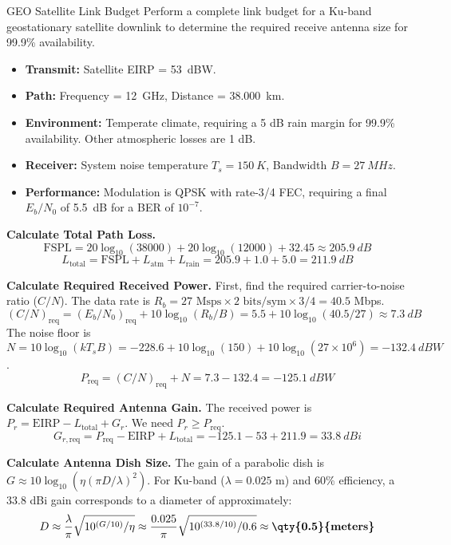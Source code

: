 \begin{workedexample}{GEO Satellite Link Budget}
     Perform a complete link budget for a Ku-band geostationary satellite downlink to determine the required receive antenna size for 99.9\% availability.
    
    \begin{itemize}
        \item \textbf{Transmit:} Satellite EIRP = \qty{53}{dBW}.
        \item \textbf{Path:} Frequency = \qty{12}{GHz}, Distance = \qty{38,000}{km}.
        \item \textbf{Environment:} Temperate climate, requiring a 5 dB rain margin for 99.9\% availability. Other atmospheric losses are 1 dB.
        \item \textbf{Receiver:} System noise temperature $T_s = \qty{150}{K}$, Bandwidth $B = \qty{27}{MHz}$.
        \item \textbf{Performance:} Modulation is QPSK with rate-3/4 FEC, requiring a final $E_b/N_0$ of \qty{5.5}{dB} for a BER of $10^{-7}$.
    \end{itemize}

    \begin{derivationsteps}
        \step \textbf{Calculate Total Path Loss.}
        \[ \text{FSPL} = 20\log_{10}(38000) + 20\log_{10}(12000) + 32.45 \approx \qty{205.9}{dB} \]
        \[ L_{\text{total}} = \text{FSPL} + L_{\text{atm}} + L_{\text{rain}} = 205.9 + 1.0 + 5.0 = \qty{211.9}{dB} \]

        \step \textbf{Calculate Required Received Power.} First, find the required carrier-to-noise ratio ($C/N$). The data rate is $R_b = 27 \text{ Msps} \times 2 \text{ bits/sym} \times 3/4 = 40.5$ Mbps.
        \[ (C/N)_{\text{req}} = (E_b/N_0)_{\text{req}} + 10\log_{10}(R_b/B) = 5.5 + 10\log_{10}(40.5/27) \approx \qty{7.3}{dB} \]
        The noise floor is $N = 10\log_{10}(kT_sB) = -228.6 + 10\log_{10}(150) + 10\log_{10}(27\times10^6) = \qty{-132.4}{dBW}$.
        \[ P_{\text{req}} = (C/N)_{\text{req}} + N = 7.3 - 132.4 = \qty{-125.1}{dBW} \]

        \step \textbf{Calculate Required Antenna Gain.} The received power is $P_r = \text{EIRP} - L_{\text{total}} + G_r$. We need $P_r \ge P_{\text{req}}$.
        \[ G_{r, \text{req}} = P_{\text{req}} - \text{EIRP} + L_{\text{total}} = -125.1 - 53 + 211.9 = \qty{33.8}{dBi} \]

        \step \textbf{Calculate Antenna Dish Size.} The gain of a parabolic dish is $G \approx 10\log_{10}(\eta (\pi D / \lambda)^2)$. For Ku-band ($\lambda=0.025$ m) and 60\% efficiency, a 33.8 dBi gain corresponds to a diameter of approximately:
        \[ D \approx \frac{\lambda}{\pi} \sqrt{10^{(G/10)}/\eta} \approx \frac{0.025}{\pi} \sqrt{10^{(33.8/10)}/0.6} \approx \textbf{\qty{0.5}{meters}} \]
    \end{derivationsteps}
    

\end{workedexample}
